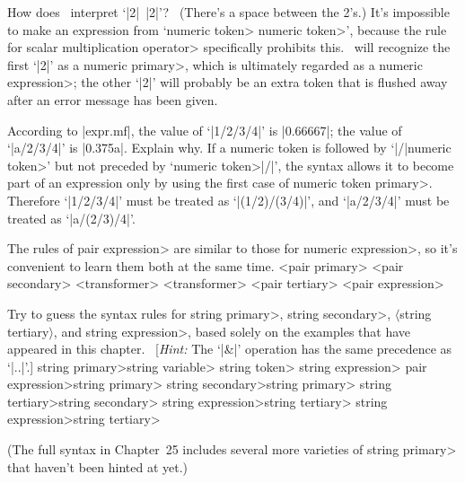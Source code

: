 {{{{\dangerexercise How does \MF\ interpret `|2|~|2|'\thinspace?
\ (There's a space between the 2's.)
\answer It's impossible to make an expression from `\<numeric token>
\<numeric token>', because the rule for \<scalar multiplication operator>
specifically prohibits this. \MF\ will recognize the first `|2|' as
a \<numeric primary>, which is ultimately regarded as a \<numeric
expression>; the other `|2|' will probably be an extra token that is
flushed away after an error message has been given.

\ddangerexercise According to |expr.mf|, the value of `|1/2/3/4|' is
|0.66667|; the value of `|a/2/3/4|' is |0.375a|. Explain why.
\answer If a numeric token is followed by `|/|\<numeric token>' but
not preceded by `\<numeric token>|/|', the syntax allows it to become part of
an expression only by using the first case of \<numeric token
primary>. Therefore `|1/2/3/4|' must be treated as `|(1/2)/(3/4)|',
and `|a/2/3/4|' must be treated as `|a/(2/3)/4|'.

\danger The rules of \<pair expression> are similar to those for
\<numeric expression>, so it's convenient to learn them both at the same time.
\beginsyntax
<pair primary>
<pair secondary>
 <transformer>
<transformer>
<pair tertiary>
<pair expression>
\endsyntax

\dangerexercise Try to guess the syntax rules for \<string primary>,
\<string secondary>, $\langle$string tertiary$\rangle$, and \<string
expression>, based solely on the examples that have appeared in this
chapter.  \ [{\sl Hint:}\/ The `|&|' operation has the same precedence
as `|..|'.]
\answer \<string primary>\is\<string variable>\parbreak
\qquad\alt\<string token>\parbreak
\def\\#1{\thinspace{\tt#1}\thinspace}%
\qquad\alt\\(\<string expression>\\)\parbreak
\qquad\alt\\{substring}\<pair expression>\\{of}\<string primary>\parbreak
\<string secondary>\is\<string primary>\parbreak
\<string tertiary>\is\<string secondary>\parbreak
\<string expression>\is\<string tertiary>\parbreak
\qquad\alt\<string expression>\\{\char`\&}\<string tertiary>\par
\medskip\noindent
(The full syntax in Chapter~25 includes several more varieties of
\<string primary> that haven't been hinted at yet.)

}}}}
